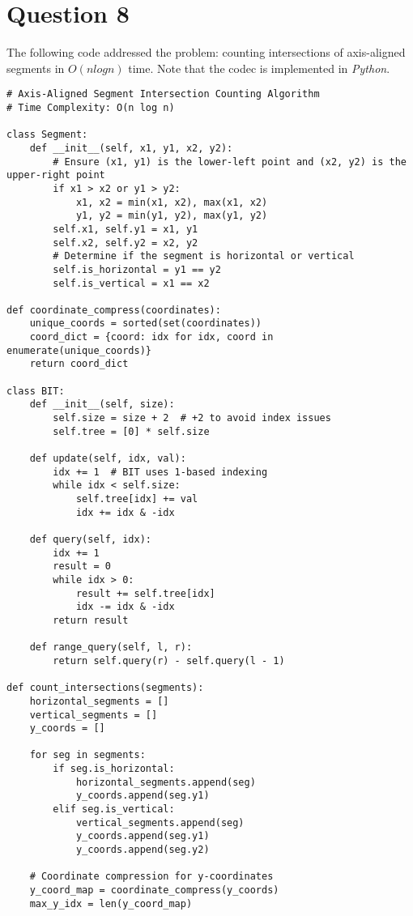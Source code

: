 \documentclass{article}
\begin{document}
\newpage

\section*{Question 8}
The following code addressed the problem: counting intersections of axis-aligned segments in $O(n log n)$ time. Note that the codec is implemented in \textit{Python}.
\begin{verbatim}
# Axis-Aligned Segment Intersection Counting Algorithm
# Time Complexity: O(n log n)

class Segment:
    def __init__(self, x1, y1, x2, y2):
        # Ensure (x1, y1) is the lower-left point and (x2, y2) is the upper-right point
        if x1 > x2 or y1 > y2:
            x1, x2 = min(x1, x2), max(x1, x2)
            y1, y2 = min(y1, y2), max(y1, y2)
        self.x1, self.y1 = x1, y1
        self.x2, self.y2 = x2, y2
        # Determine if the segment is horizontal or vertical
        self.is_horizontal = y1 == y2
        self.is_vertical = x1 == x2

def coordinate_compress(coordinates):
    unique_coords = sorted(set(coordinates))
    coord_dict = {coord: idx for idx, coord in enumerate(unique_coords)}
    return coord_dict

class BIT:
    def __init__(self, size):
        self.size = size + 2  # +2 to avoid index issues
        self.tree = [0] * self.size

    def update(self, idx, val):
        idx += 1  # BIT uses 1-based indexing
        while idx < self.size:
            self.tree[idx] += val
            idx += idx & -idx

    def query(self, idx):
        idx += 1
        result = 0
        while idx > 0:
            result += self.tree[idx]
            idx -= idx & -idx
        return result

    def range_query(self, l, r):
        return self.query(r) - self.query(l - 1)

def count_intersections(segments):
    horizontal_segments = []
    vertical_segments = []
    y_coords = []

    for seg in segments:
        if seg.is_horizontal:
            horizontal_segments.append(seg)
            y_coords.append(seg.y1)
        elif seg.is_vertical:
            vertical_segments.append(seg)
            y_coords.append(seg.y1)
            y_coords.append(seg.y2)

    # Coordinate compression for y-coordinates
    y_coord_map = coordinate_compress(y_coords)
    max_y_idx = len(y_coord_map)


\end{verbatim}
\end{document}
